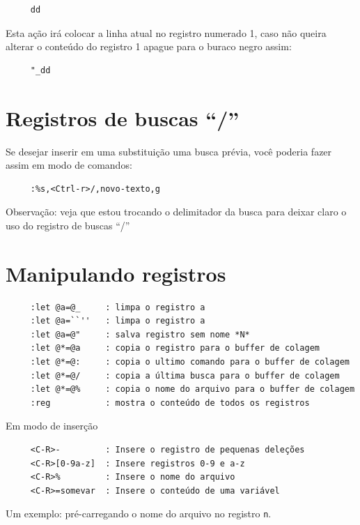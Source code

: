 \documentclass[10pt,a4paper,openany]{book}
\begin{document}
\begin{verbatim}
     dd
\end{verbatim}

Esta ação irá colocar a linha atual no registro numerado 1, caso não
queira alterar o conteúdo do registro 1 apague para o buraco negro
assim:

\begin{verbatim}
     "_dd
\end{verbatim}

\section{Registros de buscas ``/''}
\label{Registros de buscas ``/''}

Se desejar inserir em uma substituição uma busca prévia, você poderia
fazer assim em modo de comandos:

\begin{verbatim}
     :%s,<Ctrl-r>/,novo-texto,g
\end{verbatim}

Observação: veja que estou trocando o delimitador da busca para deixar
claro o uso do registro de buscas ``/''

\section{Manipulando registros}
\label{Manipulando registros}

\begin{verbatim}
     :let @a=@_     : limpa o registro a
     :let @a=``''   : limpa o registro a
     :let @a=@"     : salva registro sem nome *N*
     :let @*=@a     : copia o registro para o buffer de colagem
     :let @*=@:     : copia o ultimo comando para o buffer de colagem
     :let @*=@/     : copia a última busca para o buffer de colagem
     :let @*=@%     : copia o nome do arquivo para o buffer de colagem
     :reg           : mostra o conteúdo de todos os registros
\end{verbatim}

Em modo de inserção

\begin{verbatim}
     <C-R>-         : Insere o registro de pequenas deleções
     <C-R>[0-9a-z]  : Insere registros 0-9 e a-z
     <C-R>%         : Insere o nome do arquivo
     <C-R>=somevar  : Insere o conteúdo de uma variável
\end{verbatim}


Um exemplo: pré-carregando o nome do arquivo no registro \verb+n+.
\end{document}
